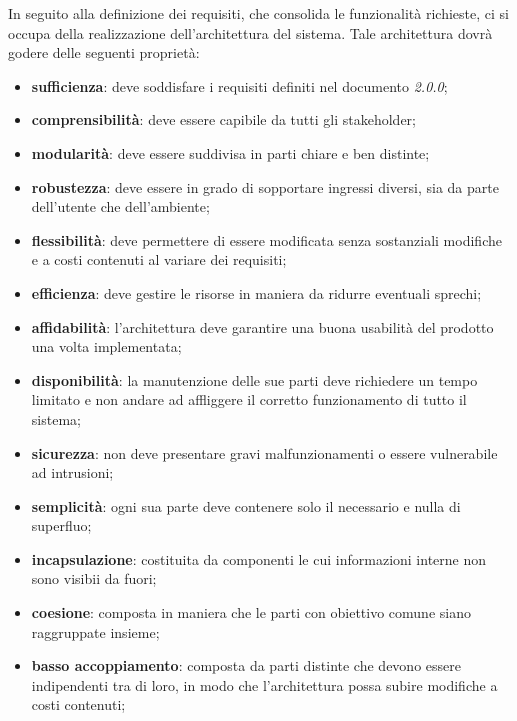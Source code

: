     	In seguito alla definizione dei requisiti, che consolida le funzionalità richieste, ci si occupa della realizzazione dell'architettura del sistema. Tale architettura dovrà godere delle seguenti proprietà:
    	\begin{itemize}
    		\item{\textbf{sufficienza}}: deve soddisfare i requisiti definiti nel documento \AdR{} \textit{2.0.0};
    		\item{\textbf{comprensibilità}}: deve essere capibile da tutti gli stakeholder;
    		\item{\textbf{modularità}}: deve essere suddivisa in parti chiare e ben distinte;
    		\item{\textbf{robustezza}}: deve essere in grado di sopportare ingressi diversi, sia da parte dell'utente che dell'ambiente;
    		\item{\textbf{flessibilità}}: deve permettere di essere modificata senza sostanziali modifiche e a costi contenuti al variare dei requisiti;
    		\item{\textbf{efficienza}}: deve gestire le risorse in maniera da ridurre eventuali sprechi;
    		\item{\textbf{affidabilità}}: l'architettura deve garantire una buona usabilità del prodotto una volta implementata;
    		\item{\textbf{disponibilità}}: la manutenzione delle sue parti deve richiedere un tempo limitato e non andare ad affliggere il corretto funzionamento di tutto il sistema;
    		\item{\textbf{sicurezza}}: non deve presentare gravi malfunzionamenti o essere vulnerabile ad intrusioni;
    		\item{\textbf{semplicità}}: ogni sua parte deve contenere solo il necessario e nulla di superfluo;
    		\item{\textbf{incapsulazione}}: costituita da componenti le cui informazioni interne non sono visibii da fuori;
    		\item{\textbf{coesione}}: composta in maniera che le parti con obiettivo comune siano raggruppate insieme;
    		\item{\textbf{basso accoppiamento}}: composta da parti distinte che devono essere indipendenti tra di loro, in modo che l'architettura possa subire modifiche a costi contenuti;
    	\end{itemize}

